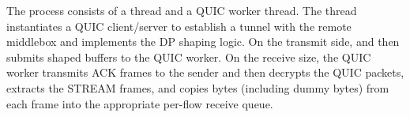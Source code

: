 The {\dshaper} process consists of a {\prepare} thread and a QUIC
worker thread.
The {\prepare} thread instantiates a QUIC client/server to establish
a tunnel with the remote middlebox and implements the DP shaping logic.
On the transmit side, {\prepare} 
and then submits shaped buffers to the QUIC worker.
On the receive size, the QUIC worker transmits ACK frames to the sender
and then decrypts the QUIC packets, extracts the STREAM frames, and copies
bytes (including dummy bytes) from each frame into the appropriate per-flow
receive queue.





